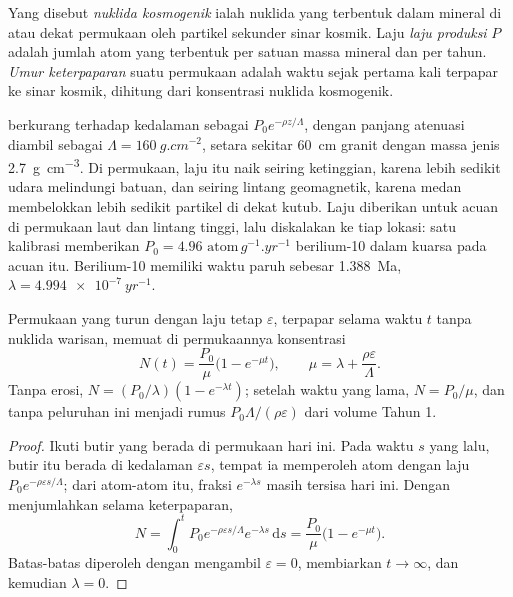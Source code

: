\begin{definition}
\label{def:b3:advanced-geochronology:cosmogenic}
Yang disebut \emph{nuklida kosmogenik} ialah
nuklida yang terbentuk dalam mineral di atau dekat permukaan oleh partikel sekunder sinar kosmik. Laju
\emph{laju produksi} $P$ adalah jumlah
atom yang terbentuk per satuan massa mineral dan per tahun. \emph{Umur
keterpaparan} suatu permukaan adalah waktu sejak pertama kali terpapar
ke sinar kosmik, dihitung dari konsentrasi nuklida kosmogenik.
\end{definition}

 berkurang terhadap kedalaman sebagai $P_0e^{-\rho z/\Lambda}$, dengan
panjang atenuasi diambil sebagai $\Lambda = \qty{160}{g.cm^{-2}}$, setara sekitar
\qty{60}{cm} granit dengan massa jenis \qty{2.7}{g.cm^{-3}}. Di permukaan, laju itu
naik seiring ketinggian, karena lebih sedikit udara melindungi batuan, dan seiring
lintang geomagnetik, karena medan membelokkan lebih sedikit partikel di dekat
kutub. Laju diberikan untuk acuan di permukaan laut dan lintang tinggi, lalu
diskalakan ke tiap lokasi: satu kalibrasi memberikan $P_0 = \num{4.96}\text{ atom}\,\unit{g^{-1}.yr^{-1}}$
berilium-10 dalam kuarsa pada acuan itu. Berilium-10 memiliki waktu paruh sebesar
\qty{1.388}{Ma}, $\lambda = \qty{4.994e-7}{yr^{-1}}$.

\begin{theorem}\label{thm:b3:advanced-geochronology:exposure}
Permukaan yang turun dengan laju tetap $\varepsilon$, terpapar selama waktu $t$
tanpa nuklida warisan, memuat di permukaannya konsentrasi
\[
N(t) = \frac{P_0}{\mu}\bigl(1 - e^{-\mu t}\bigr), \qquad
\mu = \lambda + \frac{\rho\varepsilon}{\Lambda}.
\]
Tanpa erosi, $N = (P_0/\lambda)(1 - e^{-\lambda t})$; setelah waktu yang lama,
$N = P_0/\mu$, dan tanpa peluruhan ini menjadi rumus $P_0\Lambda/(\rho\varepsilon)$
dari volume Tahun 1.
\end{theorem}

\begin{proof}
Ikuti butir yang berada di permukaan hari ini. Pada waktu $s$ yang lalu, butir itu berada di
kedalaman $\varepsilon s$, tempat ia memperoleh atom dengan laju $P_0e^{-\rho\varepsilon
s/\Lambda}$; dari atom-atom itu, fraksi $e^{-\lambda s}$ masih tersisa hari ini. Dengan menjumlahkan
selama keterpaparan,
\[
N = \int_0^t P_0e^{-\rho\varepsilon s/\Lambda}e^{-\lambda s}\,\mathrm ds
= \frac{P_0}{\mu}\bigl(1 - e^{-\mu t}\bigr).
\]
Batas-batas diperoleh dengan mengambil $\varepsilon = 0$, membiarkan $t \to \infty$, dan
kemudian $\lambda = 0$.
\end{proof}

